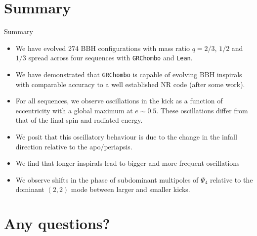 \documentclass[smaller,aspectratio=169]{beamer}
\begin{document}
\section*{Summary}

\begin{frame}{Summary}

  \begin{itemize}
    \item
    	We have evolved 274 BBH configurations with mass ratio 
    	$q=2/3$, $1/2$ and $1/3$ spread across four 
    	sequences with \texttt{GRChombo} and \texttt{Lean}.
    \item
    	We have demonstrated that \texttt{GRChombo} is capable of 
    	evolving BBH inspirals with \alert{comparable accuracy} to a well 
    	established NR code (after some work).
    \item
    	For all sequences, we observe \alert{oscillations} in the kick as a 
    	function of eccentricity with
    	a global maximum at $e\sim0.5$. These oscillations differ
    	from that of the final spin and radiated energy.
    \item
    	We posit that this oscillatory behaviour is due to the change in the
    	\alert{infall direction} relative to the \alert{apo/periapsis}. 
    \item
    	We find that longer inspirals lead to bigger and 
    	more frequent oscillations
    \item
    	We observe shifts in the \alert{phase} of subdominant 
    	multipoles of $\Psi_4$ relative to the dominant $(2,2)$ mode
    	between larger and smaller kicks.
  \end{itemize}
  
\end{frame}

\section*{Any questions?}
\end{document}
